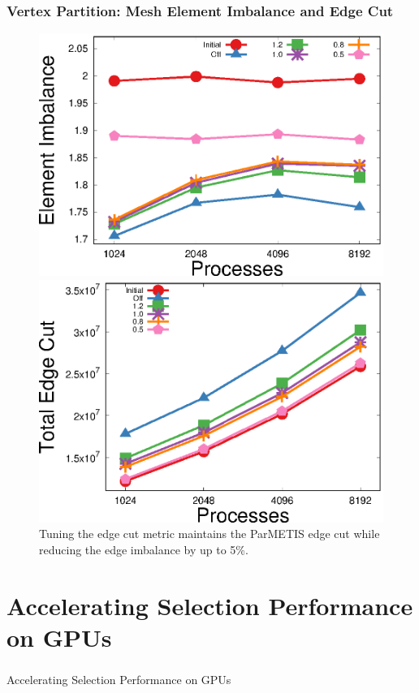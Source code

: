 \documentclass{beamer}
\begin{document}
\begin{frame}
  \frametitle{Vertex Partition: Mesh Element Imbalance and Edge Cut}
  \begin{figure}
    \centering
    \includegraphics[width=.48\textwidth]{figures/eimb_v_cores.eps}
    \includegraphics[width=.48\textwidth]{figures/ecut_v_cores.eps}\\
    Tuning the edge cut metric maintains the ParMETIS edge cut while reducing the
    edge imbalance by up to 5\%.
  \end{figure}  
\end{frame}

\section{Accelerating Selection Performance on GPUs}

\begin{frame}
  \frametitle{}
  \center \huge{Accelerating Selection Performance on GPUs}
\end{frame}

\end{document}
